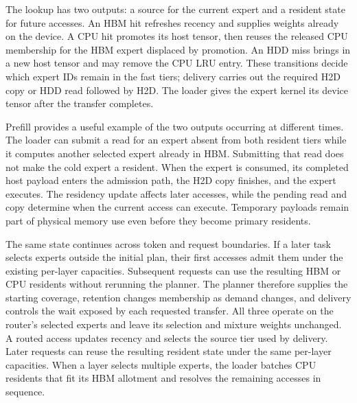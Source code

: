 The lookup has two outputs: a source for the current expert and a resident state for future accesses.
An HBM hit refreshes recency and supplies weights already on the device.
A CPU hit promotes its host tensor, then reuses the released CPU membership for the HBM expert displaced by promotion.
An HDD miss brings in a new host tensor and may remove the CPU LRU entry.
These transitions decide which expert IDs remain in the fast tiers; delivery carries out the required H2D copy or HDD read followed by H2D.
The loader gives the expert kernel its device tensor after the transfer completes.

Prefill provides a useful example of the two outputs occurring at different times.
The loader can submit a read for an expert absent from both resident tiers while it computes another selected expert already in HBM.
Submitting that read does not make the cold expert a resident.
When the expert is consumed, its completed host payload enters the admission path, the H2D copy finishes, and the expert executes.
The residency update affects later accesses, while the pending read and copy determine when the current access can execute.
Temporary payloads remain part of physical memory use even before they become primary residents.

The same state continues across token and request boundaries.
If a later task selects experts outside the initial plan, their first accesses admit them under the existing per-layer capacities.
Subsequent requests can use the resulting HBM or CPU residents without rerunning the planner.
The planner therefore supplies the starting coverage, retention changes membership as demand changes, and delivery controls the wait exposed by each requested transfer.
All three operate on the router's selected experts and leave its selection and mixture weights unchanged.
A routed access updates recency and selects the source tier used by delivery. Later requests can reuse the resulting resident state under the same per-layer capacities.
When a layer selects multiple experts, the loader batches CPU residents that fit its HBM allotment and resolves the remaining accesses in sequence.
